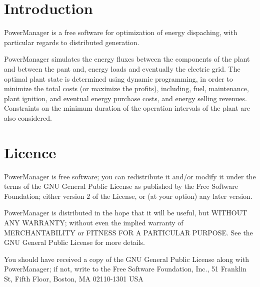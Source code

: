 \hypertarget{index_Introduction}{}\section{Introduction}\label{index_Introduction}
Power\-Manager is a free software for optimization of energy dispaching, with particular regards to distributed generation.

Power\-Manager simulates the energy fluxes between the components of the plant and between the pant and, energy loads and eventually the electric grid. The optimal plant state is determined using dynamic programming, in order to minimize the total costs (or maximize the profits), including, fuel, maintenance, plant ignition, and eventual energy purchase costs, and energy selling revenues. Constraints on the minimum duration of the operation intervals of the plant are also considered. \hypertarget{index_Licence}{}\section{Licence}\label{index_Licence}
Power\-Manager is free software; you can redistribute it and/or modify it under the terms of the G\-N\-U General Public License as published by the Free Software Foundation; either version 2 of the License, or (at your option) any later version.

Power\-Manager is distributed in the hope that it will be useful, but W\-I\-T\-H\-O\-U\-T A\-N\-Y W\-A\-R\-R\-A\-N\-T\-Y; without even the implied warranty of M\-E\-R\-C\-H\-A\-N\-T\-A\-B\-I\-L\-I\-T\-Y or F\-I\-T\-N\-E\-S\-S F\-O\-R A P\-A\-R\-T\-I\-C\-U\-L\-A\-R P\-U\-R\-P\-O\-S\-E. See the G\-N\-U General Public License for more details.

You should have received a copy of the G\-N\-U General Public License along with Power\-Manager; if not, write to the Free Software Foundation, Inc., 51 Franklin St, Fifth Floor, Boston, M\-A 02110-\/1301 U\-S\-A 